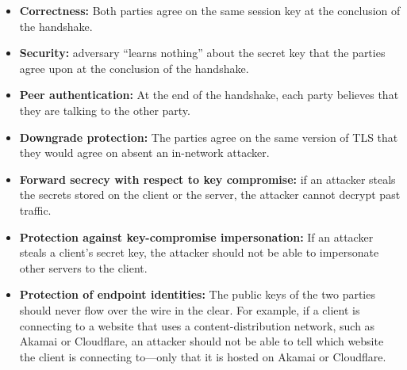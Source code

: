 \documentclass[
  letterpaper,
]{scrbook}
\theoremstyle{definition}
\theoremstyle{plain}
\theoremstyle{plain}
\theoremstyle{remark}
\begin{document}
\begin{itemize}
\item
  \textbf{Correctness:} Both parties agree on the same session key at
  the conclusion of the handshake.
\item
  \textbf{Security:} adversary ``learns nothing'' about the secret key
  that the parties agree upon at the conclusion of the handshake.
\item
  \textbf{Peer authentication:} At the end of the handshake, each party
  believes that they are talking to the other party.
\item
  \textbf{Downgrade protection:} The parties agree on the same version
  of TLS that they would agree on absent an in-network attacker.
\item
  \textbf{Forward secrecy with respect to key compromise:} if an
  attacker steals the secrets stored on the client or the server, the
  attacker cannot decrypt past traffic.

\item
  \textbf{Protection against key-compromise impersonation:} If an
  attacker steals a client's secret key, the attacker should not be able
  to impersonate other servers to the client.

\item
  \textbf{Protection of endpoint identities:} The public keys of the two
  parties should never flow over the wire in the clear. For example, if
  a client is connecting to a website that uses a content-distribution
  network, such as Akamai or Cloudflare, an attacker should not be able
  to tell which website the client is connecting to---only that it is
  hosted on Akamai or Cloudflare.
\end{itemize}
\end{document}
